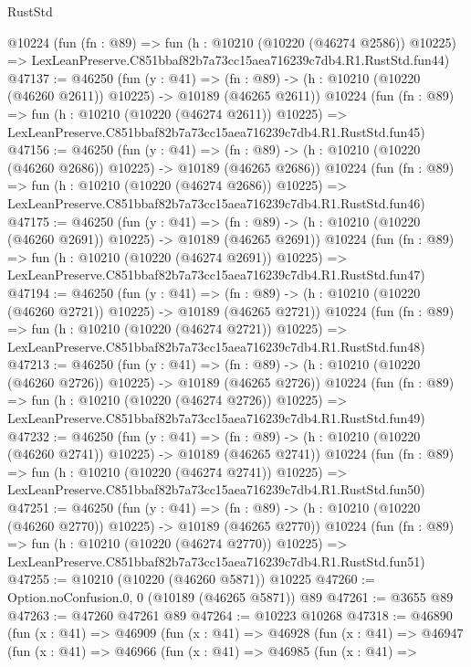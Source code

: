 \begin{lexlean}{RustStd}
\begin{coremodule}
    @10224
    (fun (fn : @89) =>
    fun (h : @10210 (@10220 (@46274 @2586)) @10225) =>
    LexLeanPreserve.C851bbaf82b7a73cc15aea716239c7db4.R1.RustStd.fun44)
@47137 := @46250
    (fun (y : @41) =>
    (fn : @89) -> (h : @10210 (@10220 (@46260 @2611)) @10225) -> @10189 (@46265 @2611))
    @10224
    (fun (fn : @89) =>
    fun (h : @10210 (@10220 (@46274 @2611)) @10225) =>
    LexLeanPreserve.C851bbaf82b7a73cc15aea716239c7db4.R1.RustStd.fun45)
@47156 := @46250
    (fun (y : @41) =>
    (fn : @89) -> (h : @10210 (@10220 (@46260 @2686)) @10225) -> @10189 (@46265 @2686))
    @10224
    (fun (fn : @89) =>
    fun (h : @10210 (@10220 (@46274 @2686)) @10225) =>
    LexLeanPreserve.C851bbaf82b7a73cc15aea716239c7db4.R1.RustStd.fun46)
@47175 := @46250
    (fun (y : @41) =>
    (fn : @89) -> (h : @10210 (@10220 (@46260 @2691)) @10225) -> @10189 (@46265 @2691))
    @10224
    (fun (fn : @89) =>
    fun (h : @10210 (@10220 (@46274 @2691)) @10225) =>
    LexLeanPreserve.C851bbaf82b7a73cc15aea716239c7db4.R1.RustStd.fun47)
@47194 := @46250
    (fun (y : @41) =>
    (fn : @89) -> (h : @10210 (@10220 (@46260 @2721)) @10225) -> @10189 (@46265 @2721))
    @10224
    (fun (fn : @89) =>
    fun (h : @10210 (@10220 (@46274 @2721)) @10225) =>
    LexLeanPreserve.C851bbaf82b7a73cc15aea716239c7db4.R1.RustStd.fun48)
@47213 := @46250
    (fun (y : @41) =>
    (fn : @89) -> (h : @10210 (@10220 (@46260 @2726)) @10225) -> @10189 (@46265 @2726))
    @10224
    (fun (fn : @89) =>
    fun (h : @10210 (@10220 (@46274 @2726)) @10225) =>
    LexLeanPreserve.C851bbaf82b7a73cc15aea716239c7db4.R1.RustStd.fun49)
@47232 := @46250
    (fun (y : @41) =>
    (fn : @89) -> (h : @10210 (@10220 (@46260 @2741)) @10225) -> @10189 (@46265 @2741))
    @10224
    (fun (fn : @89) =>
    fun (h : @10210 (@10220 (@46274 @2741)) @10225) =>
    LexLeanPreserve.C851bbaf82b7a73cc15aea716239c7db4.R1.RustStd.fun50)
@47251 := @46250
    (fun (y : @41) =>
    (fn : @89) -> (h : @10210 (@10220 (@46260 @2770)) @10225) -> @10189 (@46265 @2770))
    @10224
    (fun (fn : @89) =>
    fun (h : @10210 (@10220 (@46274 @2770)) @10225) =>
    LexLeanPreserve.C851bbaf82b7a73cc15aea716239c7db4.R1.RustStd.fun51)
@47255 := @10210 (@10220 (@46260 @5871)) @10225
@47260 := Option.noConfusion.{0, 0} (@10189 (@46265 @5871)) @89
@47261 := @3655 @89
@47263 := @47260 @47261 @89
@47264 := @10223 @10268
@47318 := @46890
    (fun (x : @41) =>
    @46909
      (fun (x : @41) =>
      @46928
        (fun (x : @41) =>
        @46947
          (fun (x : @41) =>
          @46966
            (fun (x : @41) =>
            @46985
              (fun (x : @41) =>

\end{coremodule}
\end{lexlean}
